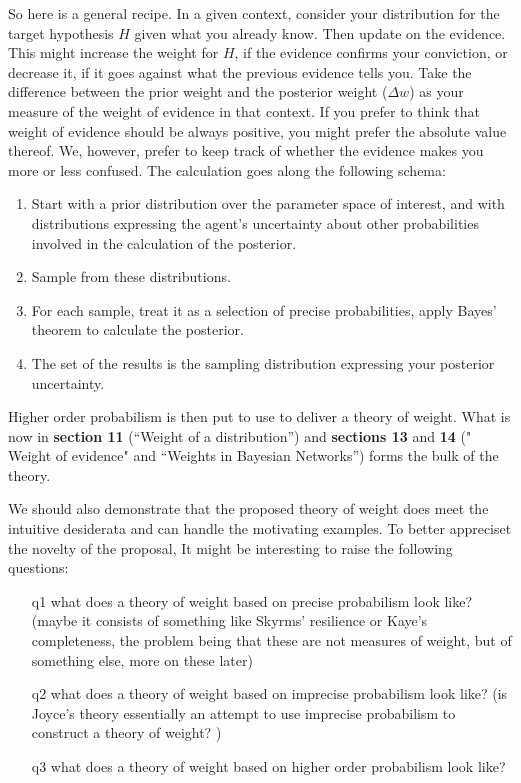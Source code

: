 \documentclass[
  10pt,
  dvipsnames,enabledeprecatedfontcommands]{scrartcl}
\begin{document}
So here is a general recipe. In a given context, consider your
distribution for the target hypothesis \(H\) given what you already
know. Then update on the evidence. This might increase the weight for
\(H\), if the evidence confirms your conviction, or decrease it, if it
goes against what the previous evidence tells you. Take the difference
between the prior weight and the posterior weight (\(\Delta w\)) as your
measure of the weight of evidence in that context. If you prefer to
think that weight of evidence should be always positive, you might
prefer the absolute value thereof. We, however, prefer to keep track of
whether the evidence makes you more or less confused. The calculation
goes along the following schema:

\begin{enumerate}
\item Start with a prior distribution over the parameter space of interest, and with distributions expressing the agent's uncertainty about other probabilities involved in the calculation of the posterior.
\item Sample from these distributions.
\item For each sample, treat it as a selection of precise probabilities, apply Bayes' theorem to calculate the posterior.
\item The set of the results is the sampling distribution expressing your posterior uncertainty.
\end{enumerate}

Higher order probabilism is then put to use to deliver a theory of
weight. What is now in \textbf{section 11} (``Weight of a
distribution'') and \textbf{sections 13} and \textbf{14} (" Weight of
evidence" and ``Weights in Bayesian Networks'') forms the bulk of the
theory.

We should also demonstrate that the proposed theory of weight does meet
the intuitive desiderata and can handle the motivating examples. To
better appreciset the novelty of the proposal, It might be interesting
to raise the following questions:

\begin{itemize}

\item[q1] what does a theory of weight based on precise probabilism look like? (maybe it consists of something like Skyrms' resilience or Kaye's completeness, the problem being that these are not measures of weight, but of something else, more on these later)

\item[q2] what does a theory of weight based on imprecise probabilism look like? (is Joyce's theory essentially an attempt to use imprecise probabilism to construct a theory of weight? )

\item[q3] what does a theory of weight based on higher order probabilism look like?

\end{itemize}
\end{document}
